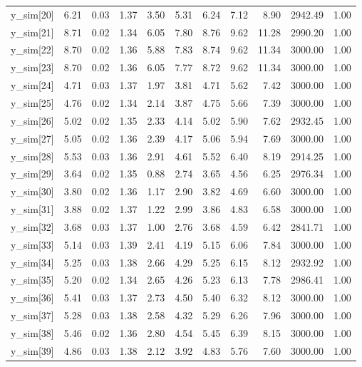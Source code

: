 \begin{table}[ht]
\begin{tabular}{rrrrrrrrrrr}
  y\_sim[20] & 6.21 & 0.03 & 1.37 & 3.50 & 5.31 & 6.24 & 7.12 & 8.90 & 2942.49 & 1.00 \\ 
  y\_sim[21] & 8.71 & 0.02 & 1.34 & 6.05 & 7.80 & 8.76 & 9.62 & 11.28 & 2990.20 & 1.00 \\ 
  y\_sim[22] & 8.70 & 0.02 & 1.36 & 5.88 & 7.83 & 8.74 & 9.62 & 11.34 & 3000.00 & 1.00 \\ 
  y\_sim[23] & 8.70 & 0.02 & 1.36 & 6.05 & 7.77 & 8.72 & 9.62 & 11.34 & 3000.00 & 1.00 \\ 
  y\_sim[24] & 4.71 & 0.03 & 1.37 & 1.97 & 3.81 & 4.71 & 5.62 & 7.42 & 3000.00 & 1.00 \\ 
  y\_sim[25] & 4.76 & 0.02 & 1.34 & 2.14 & 3.87 & 4.75 & 5.66 & 7.39 & 3000.00 & 1.00 \\ 
  y\_sim[26] & 5.02 & 0.02 & 1.35 & 2.33 & 4.14 & 5.02 & 5.90 & 7.62 & 2932.45 & 1.00 \\ 
  y\_sim[27] & 5.05 & 0.02 & 1.36 & 2.39 & 4.17 & 5.06 & 5.94 & 7.69 & 3000.00 & 1.00 \\ 
  y\_sim[28] & 5.53 & 0.03 & 1.36 & 2.91 & 4.61 & 5.52 & 6.40 & 8.19 & 2914.25 & 1.00 \\ 
  y\_sim[29] & 3.64 & 0.02 & 1.35 & 0.88 & 2.74 & 3.65 & 4.56 & 6.25 & 2976.34 & 1.00 \\ 
  y\_sim[30] & 3.80 & 0.02 & 1.36 & 1.17 & 2.90 & 3.82 & 4.69 & 6.60 & 3000.00 & 1.00 \\ 
  y\_sim[31] & 3.88 & 0.02 & 1.37 & 1.22 & 2.99 & 3.86 & 4.83 & 6.58 & 3000.00 & 1.00 \\ 
  y\_sim[32] & 3.68 & 0.03 & 1.37 & 1.00 & 2.76 & 3.68 & 4.59 & 6.42 & 2841.71 & 1.00 \\ 
  y\_sim[33] & 5.14 & 0.03 & 1.39 & 2.41 & 4.19 & 5.15 & 6.06 & 7.84 & 3000.00 & 1.00 \\ 
  y\_sim[34] & 5.25 & 0.03 & 1.38 & 2.66 & 4.29 & 5.25 & 6.15 & 8.12 & 2932.92 & 1.00 \\ 
  y\_sim[35] & 5.20 & 0.02 & 1.34 & 2.65 & 4.26 & 5.23 & 6.13 & 7.78 & 2986.41 & 1.00 \\ 
  y\_sim[36] & 5.41 & 0.03 & 1.37 & 2.73 & 4.50 & 5.40 & 6.32 & 8.12 & 3000.00 & 1.00 \\ 
  y\_sim[37] & 5.28 & 0.03 & 1.38 & 2.58 & 4.32 & 5.29 & 6.26 & 7.96 & 3000.00 & 1.00 \\ 
  y\_sim[38] & 5.46 & 0.02 & 1.36 & 2.80 & 4.54 & 5.45 & 6.39 & 8.15 & 3000.00 & 1.00 \\ 
  y\_sim[39] & 4.86 & 0.03 & 1.38 & 2.12 & 3.92 & 4.83 & 5.76 & 7.60 & 3000.00 & 1.00 \\ 

\end{tabular}
\end{table}

